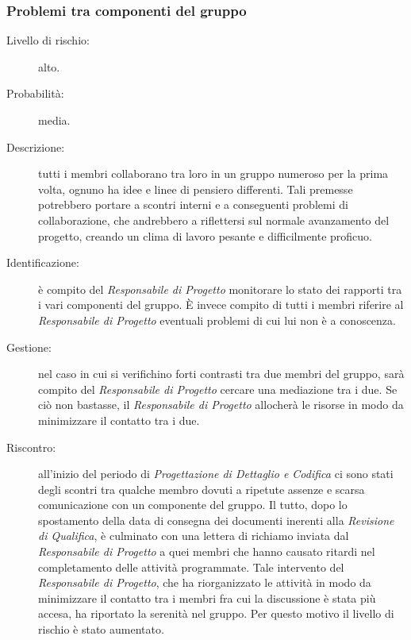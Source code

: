\subsubsection{Problemi tra componenti del gruppo}
\label{rischi}
\begin{description}
	\item[Livello di rischio:] alto.
	\item[Probabilità:] media.
	\item[Descrizione:] tutti i membri collaborano tra loro in un gruppo numeroso per la prima volta, ognuno ha idee e linee di pensiero differenti.
	Tali premesse potrebbero portare a scontri interni e a conseguenti problemi di collaborazione, che andrebbero a riflettersi sul normale	avanzamento del progetto, creando un clima di lavoro pesante e difficilmente proficuo.
	\item[Identificazione:] è compito del \textit{Responsabile di Progetto} monitorare lo stato dei rapporti tra i vari componenti del gruppo. È invece compito di tutti i membri riferire al \textit{Responsabile di Progetto} eventuali problemi di cui lui non è a conoscenza.
	\item[Gestione:] nel caso in cui si verifichino forti contrasti tra due membri del gruppo, sarà compito del \textit{Responsabile di Progetto} cercare una mediazione tra i due. Se ciò non bastasse, il \textit{Responsabile di Progetto} allocherà le risorse in modo da minimizzare il contatto tra i due.
	\item[Riscontro:] all'inizio del periodo di \textit{Progettazione di Dettaglio e Codifica} ci sono stati degli scontri tra qualche membro dovuti a ripetute assenze e scarsa comunicazione con un componente del gruppo. Il tutto, dopo lo spostamento della data di consegna dei documenti inerenti alla \textit{Revisione di Qualifica}, è culminato con una lettera di richiamo inviata dal \textit{Responsabile di Progetto} a quei membri che hanno causato ritardi nel completamento delle attività programmate. Tale intervento del \textit{Responsabile di Progetto}, che ha riorganizzato le attività in modo da minimizzare il contatto tra i membri fra cui la discussione è stata più accesa, ha riportato la serenità nel gruppo. Per questo motivo il livello di rischio è stato aumentato. 
\end{description}
